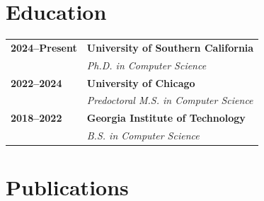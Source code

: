 \documentclass[12pt, letterpaper]{article}
\newlength{\datecolwidth}
\begin{document}
\section*{Education}
\noindent
\begin{tabularx}{\textwidth}{@{}p{\datecolwidth} X@{}}
    \textbf{2024--Present} & \textbf{University of Southern California} \\
    & \textit{Ph.D. in Computer Science} \\[4pt]
    \textbf{2022--2024} & \textbf{University of Chicago} \\
    & \textit{Predoctoral M.S. in Computer Science} \\[4pt]
    \textbf{2018--2022} & \textbf{Georgia Institute of Technology} \\
    & \textit{B.S. in Computer Science} \\
\end{tabularx}

\section*{Publications}
\end{document}
